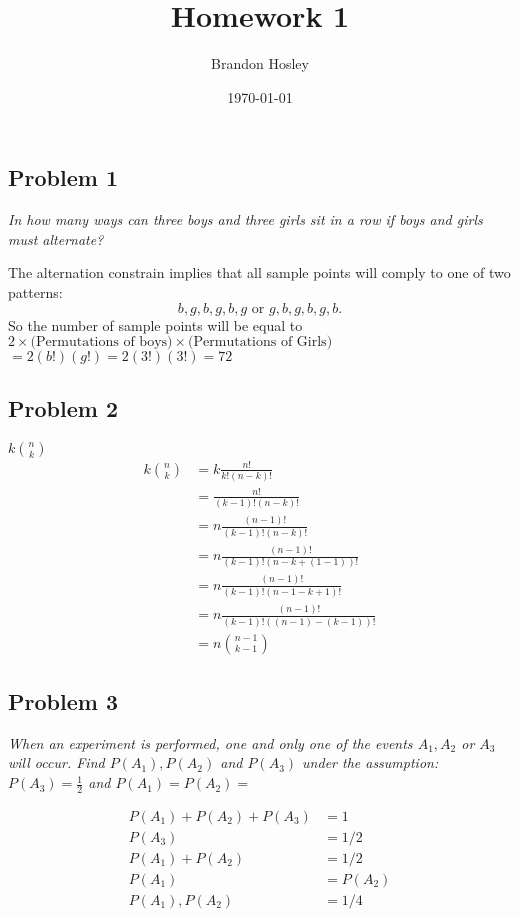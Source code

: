 \documentclass[a4paper,man,natbib]{apa6}
\title{Homework 1}
\author{Brandon Hosley}
\date{\today}
\affiliation{STAT 587 - Introduction to Probability and Statistics}
\begin{document}
\maketitle
\raggedbottom
\singlespacing

\subsection{Problem 1}
\emph{In how many ways can three boys and three girls sit in a row if boys and girls must alternate?}\vspace{1em}

The alternation constrain implies that all sample points will comply to one of two patterns:
$$
{b,g,b,g,b,g} \text{ or } {g,b,g,b,g,b}.
$$
So the number of sample points will be equal to 
$2\times\text{(Permutations of boys)}\times\text{(Permutations of Girls)}$ 
$=2(b!)(g!) = 2(3!)(3!) = 72$


\subsection{Problem 2}
\emph{$k\binom{n}{k}$}
\doublespacing
\begin{align*}
	k \binom{n}{k} &=  k \frac{n!}{k!(n-k)!} \\
	&= \frac{n!}{(k-1)!(n-k)!} \\
	&= n\frac{(n-1)!}{(k-1)!(n-k)!} \\
	&= n\frac{(n-1)!}{(k-1)!(n-k+(1-1))!} \\
	&= n\frac{(n-1)!}{(k-1)!(n-1-k+1)!} \\
	&= n\frac{(n-1)!}{(k-1)!((n-1)-(k-1))!} \\
	&= n\binom{n-1}{k-1}
\end{align*}
\singlespacing

\subsection{Problem 3}
\emph{When an experiment is performed, one and only one of the events $A_1,A_2$ or $A_3$ will occur. 
	Find $P(A_1), P(A_2)$ and $P(A_3)$ under the assumption: $P(A_3) = \frac{1}{2}$ and $P(A_1) = P(A_2)=$}

\begin{align*}
	P(A_1) + P(A_2) + P(A_3) &= 1 \\
	P(A_3) &= 1/2 \\
	P(A_1) + P(A_2) &= 1/2 \\
	P(A_1) &= P(A_2) \\
	P(A_1), P(A_2) &= 1/4 \\
\end{align*}
\end{document}
